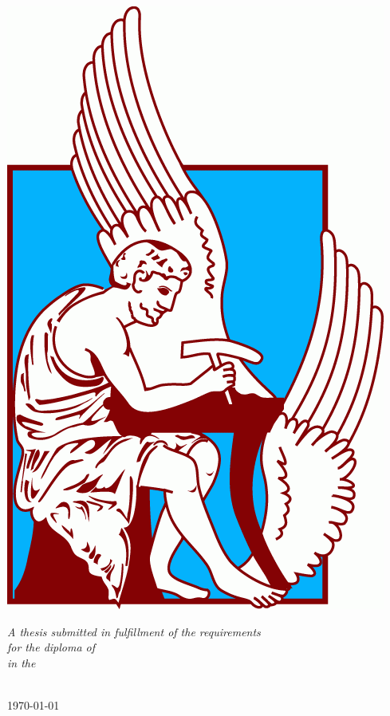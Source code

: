 \documentclass[
	12pt, %
	twoside,
	english,
	onehalfspacing, %
	liststotoc, %
	toctotoc, %
	parskip, %
	headsepline, %
	chapterinoneline, %
]{MastersDoctoralThesis} %
\begin{document}
\begin{titlepage}
\begin{center}
		\includegraphics[scale=0.21]{Images/TUC_logo.png} %
		\\
		
		\vfill

		\large \textit{A thesis submitted in fulfillment of the requirements\\ for the diploma of \degreename}\\[0.3cm] %
		\textit{in the}\\[0.4cm]
		\deptname\\[2cm] %

		\vfill

		{\large \today}\\ %
		\vfill
	\end{center}
\end{titlepage}
\end{document}
